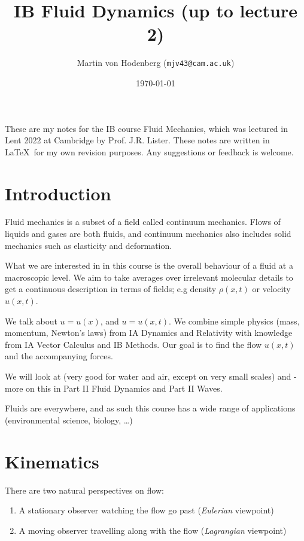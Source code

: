 \documentclass[a4paper]{scrartcl}
\title{IB Fluid Dynamics (up to lecture 2)}
\author{Martin von Hodenberg (\texttt{mjv43@cam.ac.uk})}
\date{\today}
\begin{document}
\maketitle


These are my notes for the IB course Fluid Mechanics, which was lectured in Lent 2022 at Cambridge by Prof. J.R. Lister. These notes are written in \LaTeX  \ for my own revision purposes. Any suggestions or feedback is welcome.



\tableofcontents
\newpage
\section{Introduction}
Fluid mechanics is a subset of a field called continuum mechanics. Flows of liquids and gases are both fluids, and continuum mechanics also includes solid mechanics such as elasticity and deformation. 

What we are interested in in this course is the overall behaviour of a fluid at a macroscopic level. We aim to take averages over irrelevant molecular details to get a continuous description in terms of fields; e.g density $\rho (x,t)$ or velocity $u (x,t)$.

We talk about  $u=u (x)$, and  $u=u (x,t)$. We combine simple physics (mass, momentum, Newton's laws) from IA Dynamics and Relativity with knowledge from IA Vector Calculus and IB Methods. Our goal is to find the flow $u (x,t)$ and the accompanying forces. 

We will look at  (very good for water and air, except on very small scales) and  - more on this in Part II Fluid Dynamics and Part II Waves.

Fluids are everywhere, and as such this course has a wide range of applications (environmental science, biology, \ldots)

\section{Kinematics}
There are two natural perspectives on flow:
\begin{enumerate}
    \item A stationary observer watching the flow go past (\emph{Eulerian} viewpoint)
    \item A moving observer travelling along with the flow (\emph{Lagrangian} viewpoint)
\end{enumerate}
\end{document}
